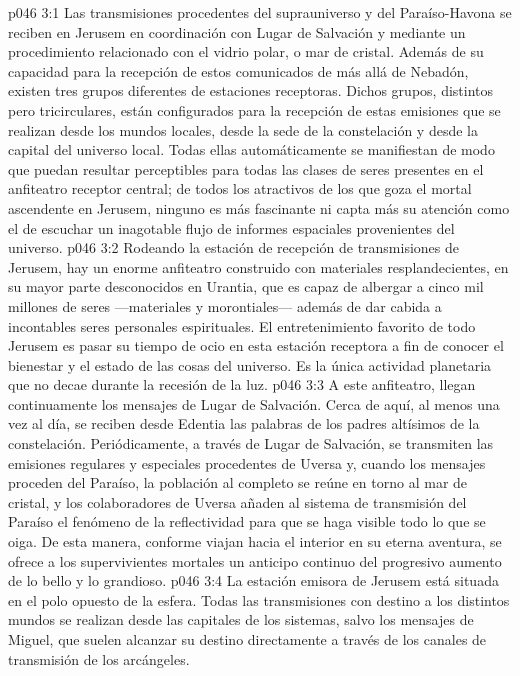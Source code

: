 \vs p046 3:1 Las transmisiones procedentes del suprauniverso y del Paraíso\hyp{}Havona se reciben en Jerusem en coordinación con Lugar de Salvación y mediante un procedimiento relacionado con el vidrio polar, o mar de cristal. Además de su capacidad para la recepción de estos comunicados de más allá de Nebadón, existen tres grupos diferentes de estaciones receptoras. Dichos grupos, distintos pero tricirculares, están configurados para la recepción de estas emisiones que se realizan desde los mundos locales, desde la sede de la constelación y desde la capital del universo local. Todas ellas automáticamente se manifiestan de modo que puedan resultar perceptibles para todas las clases de seres presentes en el anfiteatro receptor central; de todos los atractivos de los que goza el mortal ascendente en Jerusem, ninguno es más fascinante ni capta más su atención como el de escuchar un inagotable flujo de informes espaciales provenientes del universo.
\vs p046 3:2 Rodeando la estación de recepción de transmisiones de Jerusem, hay un enorme anfiteatro construido con materiales resplandecientes, en su mayor parte desconocidos en Urantia, que es capaz de albergar a cinco mil millones de seres ---materiales y morontiales--- además de dar cabida a incontables seres personales espirituales. El entretenimiento favorito de todo Jerusem es pasar su tiempo de ocio en esta estación receptora a fin de conocer el bienestar y el estado de las cosas del universo. Es la única actividad planetaria que no decae durante la recesión de la luz.
\vs p046 3:3 A este anfiteatro, llegan continuamente los mensajes de Lugar de Salvación. Cerca de aquí, al menos una vez al día, se reciben desde Edentia las palabras de los padres altísimos de la constelación. Periódicamente, a través de Lugar de Salvación, se transmiten las emisiones regulares y especiales procedentes de Uversa y, cuando los mensajes proceden del Paraíso, la población al completo se reúne en torno al mar de cristal, y los colaboradores de Uversa añaden al sistema de transmisión del Paraíso el fenómeno de la reflectividad para que se haga visible todo lo que se oiga. De esta manera, conforme viajan hacia el interior en su eterna aventura, se ofrece a los supervivientes mortales un anticipo continuo del progresivo aumento de lo bello y lo grandioso.
\vs p046 3:4 \pc La estación emisora de Jerusem está situada en el polo opuesto de la esfera. Todas las transmisiones con destino a los distintos mundos se realizan desde las capitales de los sistemas, salvo los mensajes de Miguel, que suelen alcanzar su destino directamente a través de los canales de transmisión de los arcángeles.
